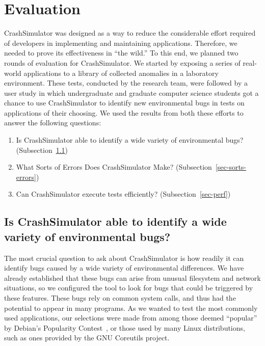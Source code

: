 \section{Evaluation}
\label{SEC:evaluation}

CrashSimulator was designed
as a way to reduce the considerable effort
required of developers
in implementing and maintaining applications.
Therefore,
we needed to prove its effectiveness in ``the wild.''
To this end,
we planned two rounds of
evaluation for CrashSimulator.
We started by exposing
a series of real-world applications
to a library of collected anomalies in a laboratory environment.
These tests,
conducted by the research team,
were followed by a user study
in which undergraduate and graduate computer science students
got a chance to use CrashSimulator
to identify new environmental bugs
in tests on applications of their choosing.
We used the results from both these efforts
to answer the following questions:

\begin{enumerate}

\item{Is CrashSimulator able to identify a wide variety of environmental
    bugs?
(Subsection~\ref{sec-env-bugs})}

\item{What Sorts of Errors Does CrashSimulator Make?
    (Subsection~\ref{sec-sorts-errors})}

\item{Can CrashSimulator
      execute tests efficiently? (Subsection~\ref{sec-perf})}

\end{enumerate}

\subsection{Is CrashSimulator able to identify a wide variety of
environmental bugs?}
\label{sec-env-bugs}

The most crucial question to ask about CrashSimulator
is how readily it can
identify bugs
caused by a wide variety of environmental differences.
We have already established
that these bugs can arise from
unusual filesystem and network situations,
so we configured the tool to look
for bugs that could be triggered by these features.
These bugs rely on common system calls,
and thus had the potential to
appear in many programs.
As we wanted to test
the most commonly used applications,
our selections were made
from among those deemed ``popular''
by Debian's Popularity Contest~\cite{DebPopCon},
or those used
by many Linux distributions,
such as ones provided
by the GNU Coreutils project.


